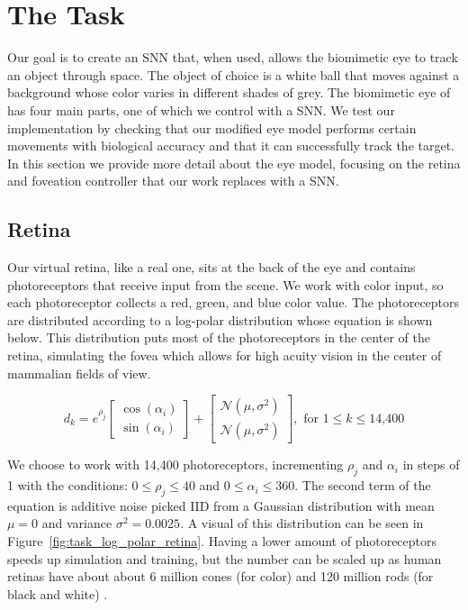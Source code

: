 \documentclass [MS] {UCLAthesis}
\begin{document}

\chapter{The Task}

Our goal is to create an SNN that, when used, allows the biomimetic eye to track an object through space. The object of choice is a white ball that moves against a background whose color varies in different shades of grey. The biomimetic eye of \citet{Arjun} has four main parts, one of which we control with a SNN. We test our implementation by checking that our modified eye model performs certain movements with biological accuracy and that it can successfully track the target. In this section we provide more detail about the eye model, focusing on the retina and foveation controller that our work replaces with a SNN.


\section{Retina}

Our virtual retina, like a real one, sits at the back of the eye and contains photoreceptors that receive input from the scene. We work with color input, so each photoreceptor collects a red, green, and blue color value. The photoreceptors are distributed according to a log-polar distribution whose equation is shown below. This distribution puts most of the photoreceptors in the center of the retina, simulating the fovea which allows for high acuity vision in the center of mammalian fields of view.

$$
d_k = e^{\rho_j} 
    \begin{bmatrix} 
        \cos( \alpha_i) \\ 
        \sin( \alpha_i) 
    \end{bmatrix}
    +
    \begin{bmatrix} 
        \mathcal{N}(\mu, \sigma^2) \\ 
        \mathcal{N}(\mu, \sigma^2)
    \end{bmatrix},
    \text{ for }
    1 \leq k \leq \text{14,400}
$$


We choose to work with 14,400 photoreceptors, incrementing $\rho_j$ and $\alpha_i$ in steps of 1 with the conditions: $ 0 \leq \rho_j \leq 40 $ and $ 0 \leq \alpha_i \leq 360 $. The second term of the equation is additive noise picked IID from a Gaussian distribution with mean $ \mu = 0 $ and variance $ \sigma^2 = 0.0025 $. A visual of this distribution can be seen in Figure~\ref{fig:task_log_polar_retina}. Having a lower amount of photoreceptors speeds up simulation and training, but the number can be scaled up as human retinas have about about 6 million cones (for color) and 120 million rods (for black and white) \citep{rodsAndCones}. 
\end{document}
